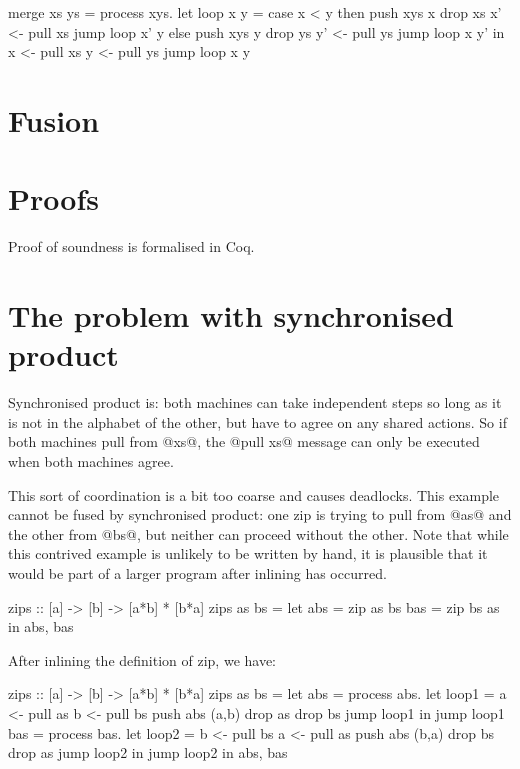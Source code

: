 \begin{code}
merge xs ys = process xys.
  let loop x y =
     case x < y
       then push xys x
            drop xs
            x' <- pull xs
            jump loop x' y
       else push xys y
            drop ys
            y' <- pull ys
            jump loop x y'
  in x <- pull xs
     y <- pull ys
     jump loop x y
\end{code}


\section{Fusion}
\label{s:Fusion}

\section{Proofs}
\label{s:Proofs}
Proof of soundness is formalised in Coq.


\section{The problem with synchronised product}
Synchronised product is: both machines can take independent steps so long as it is not in the alphabet of the other, but have to agree on any shared actions.
So if both machines pull from @xs@, the @pull xs@ message can only be executed when both machines agree.

This sort of coordination is a bit too coarse and causes deadlocks.
This example cannot be fused by synchronised product: one zip is trying to pull from @as@ and the other from @bs@, but neither can proceed without the other.
Note that while this contrived example is unlikely to be written by hand, it is plausible that it would be part of a larger program after inlining has occurred.

\begin{code}
zips :: [a] -> [b] -> [a*b] * [b*a]
zips as bs =
  let abs = zip as bs
      bas = zip bs as
  in  abs, bas
\end{code}

After inlining the definition of zip, we have:
\begin{code}
zips :: [a] -> [b] -> [a*b] * [b*a]
zips as bs =
  let abs = process abs.
       let loop1 =
          a <- pull as
          b <- pull bs
          push abs (a,b)
          drop as
          drop bs
          jump loop1
       in jump loop1
      bas = process bas.
       let loop2 =
          b <- pull bs
          a <- pull as
          push abs (b,a)
          drop bs
          drop as
          jump loop2
       in jump loop2
  in  abs, bas
\end{code}

